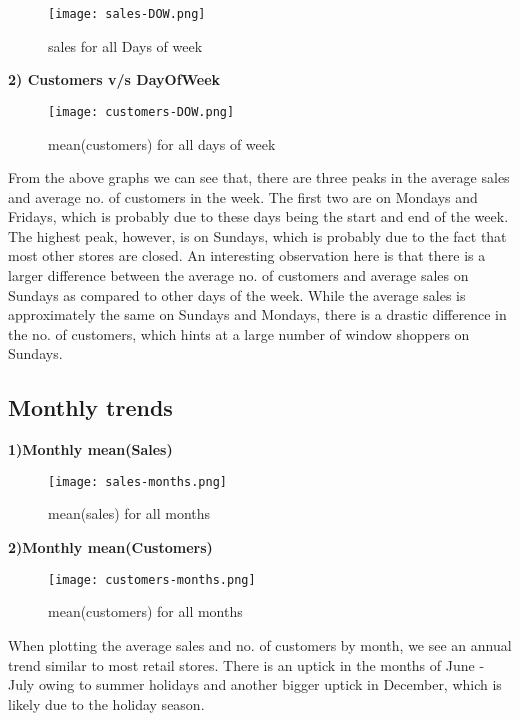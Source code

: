 \documentclass[letterpaper, 10 pt, conference]{ieeeconf}  %
\begin{document}
\begin{figure}[h!]
    \centering
    \texttt{[image: sales-DOW.png]}
    \caption{sales for all Days of week}
\end{figure}

\textbf{2) Customers v/s DayOfWeek}

\begin{figure}[h!]
    \centering
    \texttt{[image: customers-DOW.png]}
    \caption{mean(customers) for all days of week}
\end{figure}

From the above graphs we can see that, there are three peaks in the average sales and average no.
of customers in the week. The first two are on Mondays and Fridays, which is probably due to
these days being the start and end of the week. The highest peak, however, is on
Sundays, which is probably due to the fact that most other stores are closed. An interesting
observation here is that there is a larger difference between the average no. of customers and
average sales on Sundays as compared to other days of the week. While the average sales is
approximately the same on Sundays and Mondays, there is a drastic difference in the no. of
customers, which hints at a large number of window shoppers on Sundays.

\subsection{Monthly trends}
\bigskip
\textbf{1)Monthly mean(Sales)}

\begin{figure}[h!]
    \centering
    \texttt{[image: sales-months.png]}
    \caption{mean(sales) for all months}
\end{figure}


\textbf{2)Monthly mean(Customers)}

\begin{figure}[h!]
    \centering
    \texttt{[image: customers-months.png]}
    \caption{mean(customers) for all months}
\end{figure}

When plotting the average sales and no. of customers by month, we see an annual trend similar
to most retail stores. There is an uptick in the months of June - July owing to summer
holidays and another bigger uptick in December, which is likely due to the holiday season.
\end{document}
